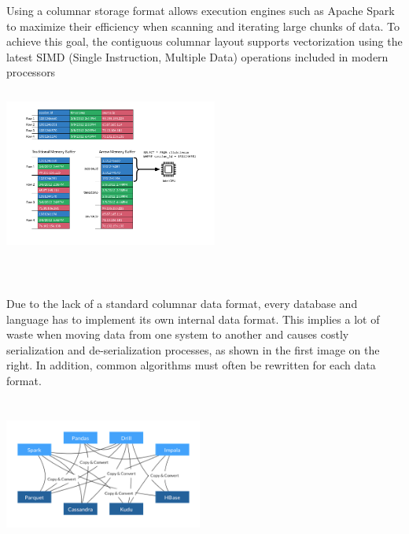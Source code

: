 \documentclass[10pt, a4paper]{report}
\begin{document}
\begin{itemize}
	\begin{minipage}{0.92\textwidth}
		\item \begin{multicols}{2}
			Using a columnar storage format allows execution engines such as Apache Spark to maximize their efficiency when scanning and iterating large chunks of data. To achieve this goal, the contiguous columnar layout supports vectorization using the latest SIMD (Single Instruction, Multiple Data) operations included in modern processors
			\columnbreak
			\begin{center}
				\includegraphics[height=5.5cm,width=7cm]{./assets/img/arrow/arrow_columnar_storage.png}
			\end{center}
		\end{multicols}
	\end{minipage} \\
	\begin{minipage}{0.92\textwidth}
		\item \begin{multicols}{2}
			Due to the lack of a standard columnar data format, every database and language has to implement its own internal data format. This implies a lot of waste when moving data from one system to another and causes costly serialization and de-serialization processes, as shown in the first image on the right. In addition, common algorithms must often be rewritten for each data format.
			\columnbreak
			\begin{center}
				\includegraphics[height=5cm,width=6.5cm]{./assets/img/arrow/without_arrow.png}

\end{center}
\end{multicols}
\end{minipage}
\end{itemize}
\end{document}
